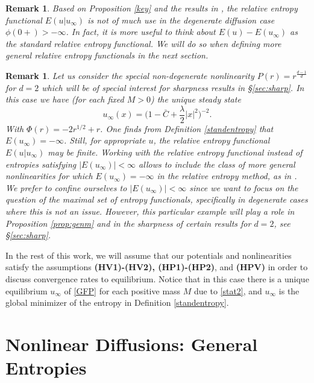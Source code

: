 \documentclass[reqno]{amsart}
\newtheorem{remark}[lemma]{Remark}
\newcommand{\uinf}{u_\infty}
\begin{document}
\begin{remark}
Based on Proposition \ref{key} and the results in \cite{CJMTU}, the relative entropy functional $E(u|\uinf)$ is not of much use in the degenerate diffusion case $\phi(0+)>-\infty$. In fact, it is more useful to think about $E(u)-E(\uinf)$ as the standard relative entropy functional. We will do so when defining more general relative entropy functionals in the next section.
\end{remark}

\begin{remark}
Let us consider the special non-degenerate nonlinearity $P(r)=r^{\frac{d-1}{d}}$ for $d=2$ which will be of special interest for sharpness results in \S\ref{sec:sharp}.  In this case we have (for each fixed $M>0$) the unique steady state 
$$
  u_\infty(x)=\Big(1-\bar C+\frac{\lambda}{2}|x|^2\Big)^{-2}. 
$$
With $\Phi(r)=-2 r^{1/2}+r$. One finds from Definition \ref{standentropy} that $E(u_\infty)=-\infty$. Still, for appropriate $u$, the relative entropy functional $E(u|u_\infty)$ may be finite. Working with the relative entropy functional instead of entropies satisfying $|E(u_\infty)|<\infty$ allows to include the class of more general nonlinearities for which $E(u_\infty)=-\infty$ in the relative entropy method, as in \cite{LeMa}. We prefer to confine ourselves to $|E(u_\infty)|<\infty$ since we want to focus on the question of the maximal set of entropy functionals, specifically in degenerate cases where this is not an issue. However, this particular example will play a role in Proposition \ref{prop:genm} and in the sharpness of certain results for $d=2$, see \S\ref{sec:sharp}.
\end{remark}    

In the rest of this work, we will assume that our potentials and nonlinearities satisfy the assumptions {\bf (HV1)-(HV2), (HP1)-(HP2)}, and {\bf (HPV)} in order to discuss convergence rates to equilibrium. Notice that in this case there is a unique equilibrium $\uinf$ of \eqref{GFP} for each positive mass $M$ due to \eqref{stat2}, and $\uinf$ is the global minimizer of the entropy in Definition \ref{standentropy}.


\section{Nonlinear Diffusions: General Entropies}\label{sec:gen-entropies}
\setcounter{equation}{0}
\end{document}
